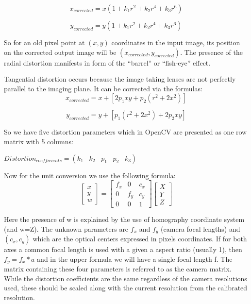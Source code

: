 \documentclass[11pt]{report}
\begin{document}
\begin{equation}
x_{corrected} = x(1+k_{1}r^{2}+k_{2}r^{4}+k_{3}r^{6})
\end{equation}


\begin{equation}
y_{corrected} = y(1+k_{1}r^{2}+k_{2}r^{4}+k_{3}r^{6})
\end{equation}

So for an old pixel point at ${(x,y)}$ coordinates in the input image, its position on the corrected output image will be ${(x_{corrected}, y_{corrected})}$. The presence of the radial distortion manifests in form of the “barrel” or “fish-eye” effect.

Tangential distortion occurs because the image taking lenses are not perfectly parallel to the imaging plane. It can be corrected via the formulas:
\begin{equation}
x_{corrected} = x + [2p_{1}xy + p_{2}(r^{2} + 2x^{2})] 
\end{equation}

\begin{equation}
y_{corrected} = y + [p_{1}(r^{2} + 2x^{2}) + 2p_{2}xy] 
\end{equation}

So we have five distortion parameters which in OpenCV are presented as one row matrix with 5 columns:

$Distortion_{coefficients}=(k_1 \hspace{10pt} k_2 \hspace{10pt} p_1 \hspace{10pt} p_2 \hspace{10pt} k_3)$

Now for the unit conversion we use the following formula:
\begin{equation}
\begin{bmatrix}
x \\ y \\w
\end{bmatrix}=
\begin{bmatrix}
f_x & 0 & c_x\\
0 & f_y & c_y\\
0 & 0 & 1
\end{bmatrix}
\begin{bmatrix}
X \\ Y \\ Z
\end{bmatrix}
\end{equation}


Here the presence of w is explained by the use of homography coordinate system (and w=Z). The unknown parameters are $f_x$ and $f_y$ (camera focal lengths) and $(c_x, c_y)$ which are the optical centers expressed in pixels coordinates. If for both axes a common focal length is used with a given a aspect ratio (usually 1), then $f_y=f_x*a$ and in the upper formula we will have a single focal length f. The matrix containing these four parameters is referred to as the camera matrix. While the distortion coefficients are the same regardless of the camera resolutions used, these should be scaled along with the current resolution from the calibrated resolution.
\end{document}
